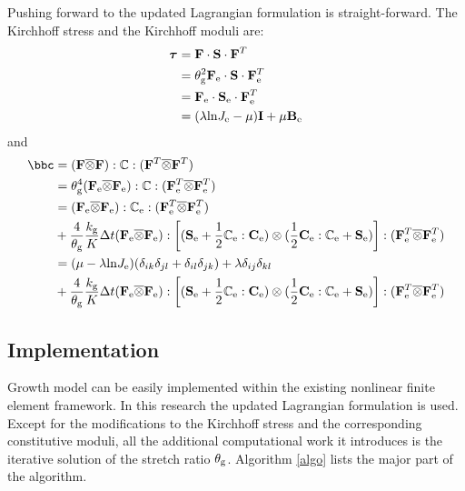 Pushing forward to the updated Lagrangian formulation is straight-forward. The Kirchhoff stress and the Kirchhoff moduli are:
\begin{equation} \label{eq:tau}
\begin{split}
\boldsymbol{\tau} &= \bold{F} \cdot \bold{S} \cdot \bold{F}^T \\
	&= \theta_{\mathrm{g}}^2 \bold{F}_{\mathrm{e}} \cdot \bold{S} \cdot \bold{F}_{\mathrm{e}}^T \\
	&= \bold{F}_{\mathrm{e}} \cdot \bold{S}_{\mathrm{e}} \cdot \bold{F}_{\mathrm{e}}^T \\
	&= (\lambda\mathrm{ln}J_{\mathrm{e}} - \mu)\bold{I} + \mu\bold{B}_{\mathrm{e}}
\end{split}
\end{equation}
and
\begin{equation} \label{eq:tauModuli}
\begin{split}
\bbc &= (\bF \overline\otimes \bF) : \bbC : (\bF^T \overline\otimes \bF^T) \\
	&= \theta_\rmg^4 (\bF_\rme \overline\otimes \bF_\rme) : \bbC : (\bF_\rme^T \overline\otimes \bF_\rme^T) \\
	&= (\bF_\rme \overline\otimes \bF_\rme) : \bbC_\rme : (\bF_\rme^T \overline\otimes \bF_\rme^T) \\
	&+ \frac{4}{\theta_\rmg}\frac{k_\rmg}{K}\Delta t (\bF_\rme \overline\otimes \bF_\rme) :  
	\bigg[(\bS_\rme + \frac{1}{2}\bbC_\rme : \bC_\rme ) \otimes ( \frac{1}{2} \bC_\rme : \bbC_\rme + \bS_\rme )\bigg]
: (\bF_\rme^T \overline\otimes \bF_\rme^T) \\
	&= (\mu - \lambda\mathrm{ln}J_\rme)(\delta_{ik}\delta_{jl} + \delta_{il}\delta_{jk}) + \lambda\delta_{ij}\delta_{kl} \\ 
	&+  \frac{4}{\theta_\rmg}\frac{k_\rmg}{K}\Delta t (\bF_\rme \overline\otimes \bF_\rme) :  
	\bigg[(\bS_\rme + \frac{1}{2}\bbC_\rme : \bC_\rme ) \otimes ( \frac{1}{2} \bC_\rme : \bbC_\rme + \bS_\rme )\bigg]: (\bF_\rme^T \overline\otimes \bF_\rme^T) 
\end{split}
\end{equation}

\subsection{Implementation}
Growth model can be easily implemented within the existing nonlinear finite element framework. In this research the updated Lagrangian formulation is used. Except for the modifications to the Kirchhoff stress and the corresponding constitutive moduli, all the additional computational work it introduces is the iterative solution of the stretch ratio $\theta_{\mathrm{g}}$. Algorithm \ref{algo} lists the major part of the algorithm.

